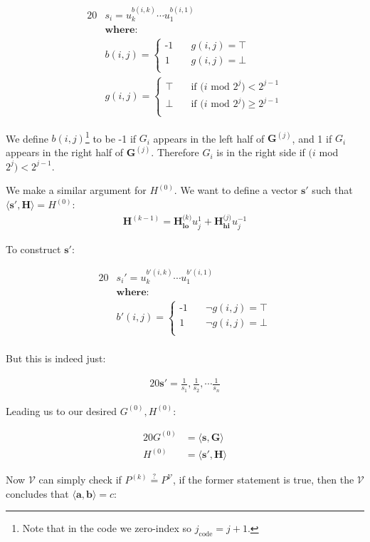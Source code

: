 \documentclass{article}
\newcommand{\eq}[1]{\begin{alignat*}{20}#1\end{alignat*}}
\newcommand{\eqn}[2]{\begin{equation}\label{#1}\begin{split}#2\end{split}\end{equation}}
\renewcommand{\vec}[1]{\boldsymbol{#1}}
\newcommand{\V}{\mathcal{V}}
\newcommand{\dotp}[2]{\langle #1, #2 \rangle}
\newcommand{\opn}[1]{\operatorname{#1}}
\newcommand{\veclo}[1]{\vec{#1_{\opn{lo}}}}
\newcommand{\vechi}[1]{\vec{#1_{\opn{hi}}}}
\begin{document}
\eq{
	&s_i = u^{b(i,k)}_k \cdots u^{b(i,1)}_1 \\
	&\textbf{where:} \\
	&b(i,j) = 
	\begin{cases}
		\text{-1} &\quad  g(i,j) = \top \\
		\text{1}  &\quad  g(i,j) = \bot \\
	\end{cases} \\
	&g(i,j) = 
	\begin{cases}
		\top &\quad  \text{if $(i$ mod $2^j) <    2^{j-1}$} \\
		\bot &\quad  \text{if $(i$ mod $2^j) \geq 2^{j-1}$} \\
	\end{cases}
}

We define $b(i,j)$\footnote{Note that in the code we zero-index
so $j_{\text{code}} = j+1$.} to be -1 if $G_i$ appears in the left
half of $\vec{G}^{(j)}$, and 1 if $G_i$ appears in the right half
of $\vec{G}^{(j)}$. Therefore $G_i$ is in the right side if
$(i$ mod $2^j) < 2^{j-1}$.

We make a similar argument for $H^{(0)}$. We want to define a vector
$\vec{s'}$ such that $\dotp{\vec{s'}}{\vec{H}} = H^{(0)}$:
\eqn{H0}{
	\vec{H}^{(k-1)} = \veclo{H^\textit{(k)}} u^{1}_j + \vechi{H^\textit{(j)}} u^{-1}_j
}

To construct $\vec{s'}$:

\eq{
	&s_i' = u^{b'(i,k)}_k \cdots u^{b'(i,1)}_1 \\
	&\textbf{where:} \\
	&b'(i,j) = 
	\begin{cases}
		\text{-1} &\quad  \lnot g(i,j) = \top \\
		\text{1}  &\quad  \lnot g(i,j) = \bot \\
	\end{cases} \\
}

But this is indeed just:

\eq{
	\vec{s'} = \frac{1}{s_1}, \frac{1}{s_2}, \cdots \frac{1}{s_n}
}

Leading us to our desired $G^{(0)}, H^{(0)}$:

\eq{
	G^{(0)} &= \dotp{\vec{s}}{\vec{G}} \\
	H^{(0)} &= \dotp{\vec{s'}}{\vec{H}}
}

Now $\V$ can simply check if $P^{(k)} \stackrel{?}{=} P^{\V}$,
if the former statement is true, then the $\V$ concludes that
$\dotp{\vec{a}}{\vec{b}} = c$:
\end{document}
